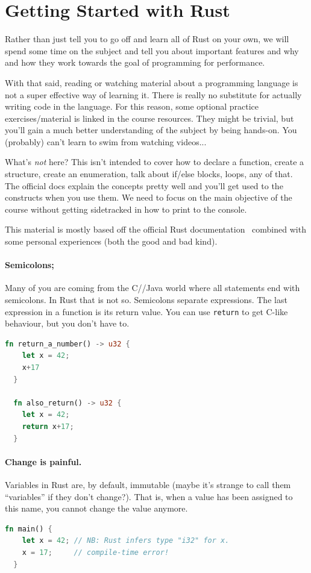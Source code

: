 




\section*{Getting Started with Rust}
Rather than just tell you to go off and learn all of Rust on your own, we will spend some time on the subject and tell you about important features and why and how they work towards the goal of programming for performance.

With that said, reading or watching material about a programming language is not a super effective way of learning it. There is really no substitute for actually writing code in the language. For this reason, some optional practice exercises/material is linked in the course resources. They might be trivial, but you'll gain a much better understanding of the subject by being hands-on. You (probably) can't learn to swim from watching videos...

What's \textit{not} here? This isn't intended to cover how to declare a function, create a structure, create an enumeration, talk about if/else blocks, loops, any of that. The official docs explain the concepts pretty well and you'll get used to the constructs when you use them. We need to focus on the main objective of the course without getting sidetracked in how to print to the console. 

This material is mostly based off the official Rust documentation~\cite{rustdocs} combined with some personal experiences (both the good and bad kind). 

\paragraph{Semicolons;} Many of you are coming from the C/\CPP/Java world where all statements end with semicolons. In Rust that is
not so. Semicolons separate expressions. The last expression in a function is its return value. You can use \texttt{return} to get
C-like behaviour, but you don't have to.
\begin{lstlisting}[language=Rust]
  fn return_a_number() -> u32 {
    let x = 42;
    x+17
  }

  fn also_return() -> u32 {
    let x = 42;
    return x+17;
  }
\end{lstlisting}

\paragraph{Change is painful.}
Variables in Rust are, by default, immutable (maybe it's strange to call them ``variables'' if they don't change?). That is, when a value has been assigned to this name, you cannot change the value anymore.
\begin{lstlisting}[language=Rust]
  fn main() {
    let x = 42; // NB: Rust infers type "i32" for x.
    x = 17;     // compile-time error!
  }
\end{lstlisting}

